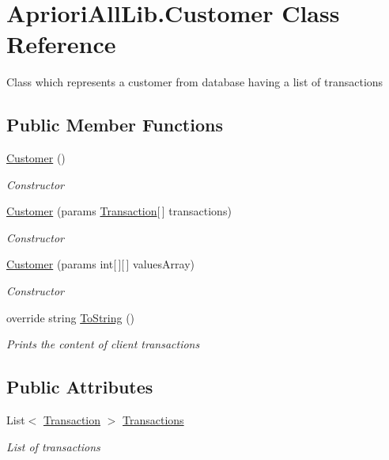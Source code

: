 \hypertarget{class_apriori_all_lib_1_1_customer}{\section{Apriori\-All\-Lib.\-Customer Class Reference}
\label{class_apriori_all_lib_1_1_customer}
}


Class which represents a customer from database having a list of transactions  


\subsection*{Public Member Functions}
\begin{DoxyCompactItemize}
\item 
\hyperlink{class_apriori_all_lib_1_1_customer_af02616d948989c7ff6161efc2488ecab}{Customer} ()
\begin{DoxyCompactList}\small\item\em Constructor \end{DoxyCompactList}\item 
\hyperlink{class_apriori_all_lib_1_1_customer_a168c8ef2fa0b53671ea51fa21d788f7e}{Customer} (params \hyperlink{class_apriori_all_lib_1_1_transaction}{Transaction}\mbox{[}$\,$\mbox{]} transactions)
\begin{DoxyCompactList}\small\item\em Constructor \end{DoxyCompactList}\item 
\hyperlink{class_apriori_all_lib_1_1_customer_a8a0e52125e85fae2662fa7edb756cedd}{Customer} (params int\mbox{[}$\,$\mbox{]}\mbox{[}$\,$\mbox{]} values\-Array)
\begin{DoxyCompactList}\small\item\em Constructor \end{DoxyCompactList}\item 
override string \hyperlink{class_apriori_all_lib_1_1_customer_a311c3424f3f1207afe9b883cc41cae60}{To\-String} ()
\begin{DoxyCompactList}\small\item\em Prints the content of client transactions \end{DoxyCompactList}\end{DoxyCompactItemize}
\subsection*{Public Attributes}
\begin{DoxyCompactItemize}
\item 
List$<$ \hyperlink{class_apriori_all_lib_1_1_transaction}{Transaction} $>$ \hyperlink{class_apriori_all_lib_1_1_customer_a5bf3b782d5e9c582e3f395834b7bddad}{Transactions}
\begin{DoxyCompactList}\small\item\em List of transactions \end{DoxyCompactList}\end{DoxyCompactItemize}



